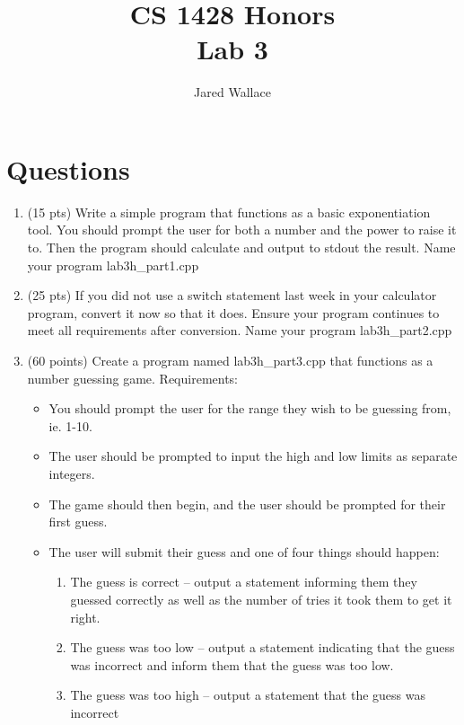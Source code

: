 \documentclass[letterpaper,12pt]{article}
\title{\Large CS 1428 Honors\\Lab 3}
\author{Jared Wallace}
\date{}
\begin{document}
\maketitle

\vspace{30mm}

\section*{Questions}

\begin{enumerate}
    \item (15 pts) Write a simple program that functions as a basic exponentiation tool.
          You should prompt the user for both a number and the power to raise it to.
          Then the program should calculate and output to stdout the result. Name
          your program lab3h\_part1.cpp
    \item (25 pts) If you did not use a switch statement last week in your calculator program,
          convert it now so that it does. Ensure your program continues to meet all
          requirements after conversion. Name your program lab3h\_part2.cpp
    \item (60 points) Create a program named lab3h\_part3.cpp that functions as a number guessing game.
          Requirements:
            \begin{itemize}
                \item You should prompt the user for the range they wish to be guessing from, ie. 1-10.
                \item The user should be prompted to input the high and low limits as separate integers.
                \item The game should then begin, and the user should be prompted for their first guess.
                \item The user will submit their guess and one of four things should happen:
                    \begin{enumerate}
                        \item The guess is correct – output a statement informing them they guessed
                              correctly as well as the number of tries it took them to get it right.
                        \item The guess was too low – output a statement indicating that the guess
                              was incorrect and inform them that the guess was too low.
                        \item The guess was too high – output a statement that the guess was incorrect

\end{enumerate}
\end{itemize}
\end{enumerate}
\end{document}
